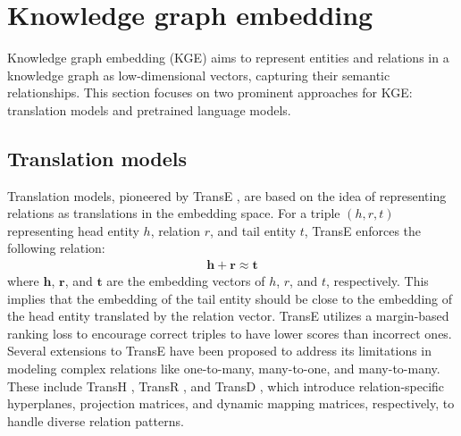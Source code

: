 \section{Knowledge graph embedding}
Knowledge graph embedding (KGE) aims to represent entities and relations in a knowledge graph as low-dimensional vectors, capturing their semantic relationships. This section focuses on two prominent approaches for KGE: translation models and pretrained language models.
\subsection{Translation models}
Translation models, pioneered by TransE \cite{NIPS2013_1cecc7a7}, are based on the idea of representing relations as translations in the embedding space. For a triple $(h, r, t)$ representing head entity $h$, relation $r$, and tail entity $t$, TransE enforces the following relation:
\begin{align}
\mathbf{h} + \mathbf{r} \approx \mathbf{t}
\end{align}
where $\mathbf{h}$, $\mathbf{r}$, and $\mathbf{t}$ are the embedding vectors of $h$, $r$, and $t$, respectively. This implies that the embedding of the tail entity should be close to the embedding of the head entity translated by the relation vector. TransE utilizes a margin-based ranking loss to encourage correct triples to have lower scores than incorrect ones.
Several extensions to TransE have been proposed to address its limitations in modeling complex relations like one-to-many, many-to-one, and many-to-many. These include TransH \cite{Wang_Zhang_Feng_Chen_2014}, TransR \cite{Lin_Liu_Sun_Liu_Zhu_2015}, and TransD \cite{ji-etal-2015-knowledge}, which introduce relation-specific hyperplanes, projection matrices, and dynamic mapping matrices, respectively, to handle diverse relation patterns.
